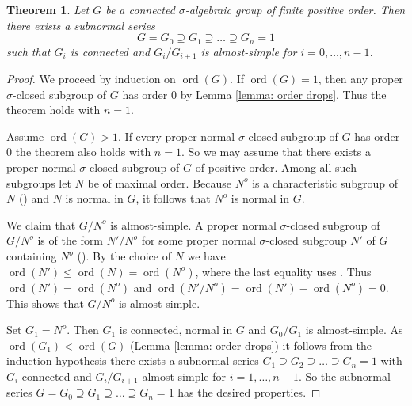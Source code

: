 \documentclass[oneside,reqno]{amsart}
\newtheorem{theo}{Theorem}[section]
\theoremstyle{definition}
\newcommand{\ord}{\operatorname{ord}}
\newcommand{\s}{\sigma}
\newcommand{\red}{\operatorname{red}}
\begin{document}
\begin{theo} \label{theo: Jordan Hoelder for sreduced}
	Let $G$ be a connected $\s$-algebraic group of finite positive order. Then there exists a subnormal series
	$$G=G_0\supseteq G_1\supseteq\ldots\supseteq G_n=1$$
	such that $G_i$ is connected and $G_i/G_{i+1}$ is almost-simple for $i=0,\ldots,n-1$. 
\end{theo}
\begin{proof}
	We proceed by induction on $\ord(G)$. If $\ord(G)=1$, then any proper $\s$-closed subgroup of $G$ has order $0$ by Lemma \ref{lemma: order drops}. Thus the theorem holds with $n=1$.
	
Assume $\ord(G)>1$.
	If every proper normal $\s$-closed subgroup of $G$ has order $0$ the theorem also holds with $n=1$. So we may assume that there exists a proper normal $\s$-closed subgroup of $G$ of positive order. Among all such subgroups let $N$ be of maximal order. Because $N^o$ is a characteristic subgroup of $N$ (\cite[Prop. 6.17]{Wibmer:almostsimple}) and $N$ is normal in $G$, it follows that $N^o$ is normal in $G$.	
	
	We claim that $G/N^o$ is almost-simple. A proper normal $\s$-closed subgroup of $G/N^o$ is of the form $N'/N^o$ for some proper normal $\s$-closed subgroup $N'$ of $G$ containing $N^o$ (\cite[Theorem~5.9]{Wibmer:almostsimple}). By the choice of $N$ we have $\ord(N')\leq\ord(N)=\ord(N^o)$, where the last equality uses \cite[Cor. 6.13]{Wibmer:almostsimple}. Thus $\ord(N')=\ord(N^o)$ and $\ord(N'/N^o)=\ord(N')-\ord(N^o)=0$. This shows that $G/N^o$ is almost-simple.
	
	Set $G_1=N^o$. Then $G_1$ is connected, normal in $G$ and $G_0/G_1$ is almost-simple. As $\ord(G_1)<\ord(G)$ (Lemma \ref{lemma: order drops}) it follows from the induction hypothesis there exists a subnormal series $G_1\supseteq G_2\supseteq\ldots\supseteq G_n=1$ with $G_i$ connected and $G_i/G_{i+1}$ almost-simple for $i=1,\ldots, n-1$.
	So the subnormal series $G=G_0\supseteq G_1\supseteq\ldots\supseteq G_n=1$ has the desired properties.	
%	
\end{proof}
\end{document}
